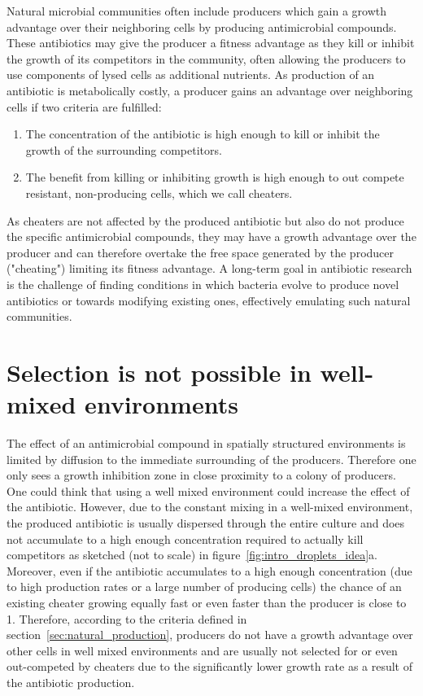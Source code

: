 Natural microbial communities often include producers which gain a growth advantage over their neighboring cells by producing antimicrobial compounds. These antibiotics may give the producer a fitness advantage as they kill or inhibit the growth of its competitors in the community, often allowing the producers to use components of lysed cells as additional nutrients.
As production of an antibiotic is metabolically costly, a producer gains an advantage over neighboring cells if two criteria are fulfilled:
\begin{enumerate}
\item The concentration of the antibiotic is high enough to kill or inhibit the growth of the surrounding competitors.
\item The benefit from killing or inhibiting growth is high enough to out compete resistant, non-producing cells, which we call cheaters.
\end{enumerate}
As cheaters are not affected by the produced antibiotic but also do not produce the specific antimicrobial compounds, they may have a growth advantage over the producer and can therefore overtake the free space generated by the producer ("cheating") limiting its fitness advantage.
A long-term goal in antibiotic research is the challenge of finding conditions in which bacteria evolve to produce novel antibiotics or towards modifying existing ones, effectively emulating such natural communities.~\cite{Charusanti2012-uy} 

\section{Selection is not possible in well-mixed environments}

The effect of an antimicrobial compound in spatially structured environments is limited by diffusion to the immediate surrounding of the producers. Therefore one only sees a growth inhibition zone in close proximity to a colony of producers. One could think that using a well mixed environment could increase the effect of the antibiotic.
However, due to the constant mixing in a well-mixed environment, the produced antibiotic is usually dispersed through the entire culture and does not accumulate to a high enough concentration required to actually kill competitors as sketched (not to scale) in figure~\ref{fig:intro_droplets_idea}a. Moreover, even if the antibiotic accumulates to a high enough concentration (due to high production rates or a large number of producing cells) the chance of an existing cheater growing equally fast or even faster than the producer is close to 1.
Therefore, according to the criteria defined in section~\ref{sec:natural_production}, producers do not have a growth advantage over other cells in well mixed environments and are usually not selected for or even out-competed by cheaters due to the significantly lower growth rate as a result of the antibiotic production.

